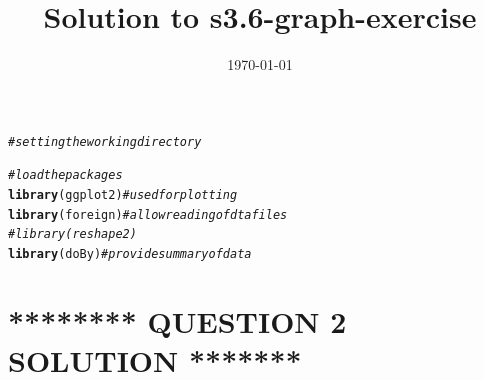 \documentclass[DIV=calc, paper=a4, fontsize=11pt]{scrartcl}\usepackage[]{graphicx}\usepackage[]{color}
\makeatletter
\newcommand{\hlcom}[1]{\textcolor[rgb]{0.678,0.584,0.686}{\textit{#1}}}%
\newcommand{\hlstd}[1]{\textcolor[rgb]{0.345,0.345,0.345}{#1}}%
\newcommand{\hlkwd}[1]{\textcolor[rgb]{0.737,0.353,0.396}{\textbf{#1}}}%
\newenvironment{kframe}{%
 \def\at@end@of@kframe{}%
 \ifinner\ifhmode%
  \def\at@end@of@kframe{\end{minipage}}%
  \begin{minipage}{\columnwidth}%
 \fi\fi%
 \def\FrameCommand##1{\hskip\@totalleftmargin \hskip-\fboxsep
 \colorbox{shadecolor}{##1}\hskip-\fboxsep
     \hskip-\linewidth \hskip-\@totalleftmargin \hskip\columnwidth}%
 \MakeFramed {\advance\hsize-\width
   \@totalleftmargin\z@ \linewidth\hsize
   \@setminipage}}%
 {\par\unskip\endMakeFramed%
 \at@end@of@kframe}
\newenvironment{knitrout}{}{} %
\makeatother
\begin{document}
\title{Solution to s3.6-graph-exercise}
\author{}
\date{\today}
\maketitle{}
\clearpage
\begin{knitrout}
\color{fgcolor}\begin{kframe}
\begin{alltt}
\hlcom{# setting the working directory}


\hlcom{# load the packages}
\hlkwd{library}\hlstd{(ggplot2)}  \hlcom{#used for plotting}
\hlkwd{library}\hlstd{(foreign)}  \hlcom{#allow reading of dta files}
\hlcom{# library(reshape2)}
\hlkwd{library}\hlstd{(doBy)}  \hlcom{#provide summary of data}
\end{alltt}


{\ttfamily\noindent\itshape\color{messagecolor}{\#\# Loading required package: survival\\\#\# Loading required package: splines\\\#\# Loading required package: MASS}}\end{kframe}
\end{knitrout}

\section*{******** QUESTION 2 SOLUTION *******}
\end{document}
